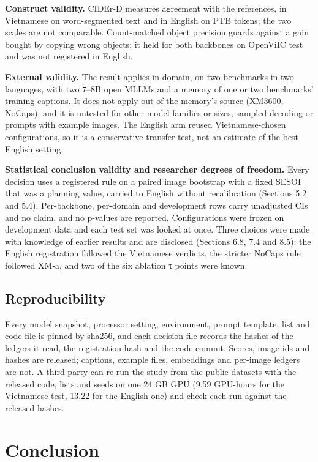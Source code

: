 \documentclass[manuscript,screen]{acmart}
\begin{document}
\textbf{Construct validity.} CIDEr-D measures agreement with the references, in Vietnamese on
word-segmented text and in English on PTB tokens; the two scales are not comparable. Count-matched
object precision guards against a gain bought by copying wrong objects; it held for both backbones
on OpenViIC test and was not registered in English.

\textbf{External validity.} The result applies in domain, on two benchmarks in two languages, with
two 7--8B open MLLMs and a memory of one or two benchmarks' training captions. It does not apply out
of the memory's source (XM3600, NoCaps), and it is untested for other model families or sizes,
sampled decoding or prompts with example images. The English arm reused Vietnamese-chosen
configurations, so it is a conservative transfer test, not an estimate of the best English setting.

\textbf{Statistical conclusion validity and researcher degrees of freedom.} Every decision uses a
registered rule on a paired image bootstrap with a fixed SESOI that was a planning value, carried to
English without recalibration (Sections 5.2 and 5.4). Per-backbone, per-domain and development rows
carry unadjusted CIs and no claim, and no p-values are reported. Configurations were frozen on
development data and each test set was looked at once. Three choices were made with knowledge of
earlier results and are disclosed (Sections 6.8, 7.4 and 8.5): the English registration followed the
Vietnamese verdicts, the stricter NoCaps rule followed XM-a, and two of the six ablation τ points
were known.

\subsection{Reproducibility}\label{reproducibility}

Every model snapshot, processor setting, environment, prompt template, list and code file is pinned
by sha256, and each decision file records the hashes of the ledgers it read, the registration hash
and the code commit. Scores, image ids and hashes are released; captions, example files, embeddings
and per-image ledgers are not. A third party can re-run the study from the public datasets with the
released code, lists and seeds on one 24 GB GPU (9.59 GPU-hours for the Vietnamese test, 13.22 for
the English one) and check each run against the released hashes.

\section{Conclusion}\label{conclusion}
\end{document}
